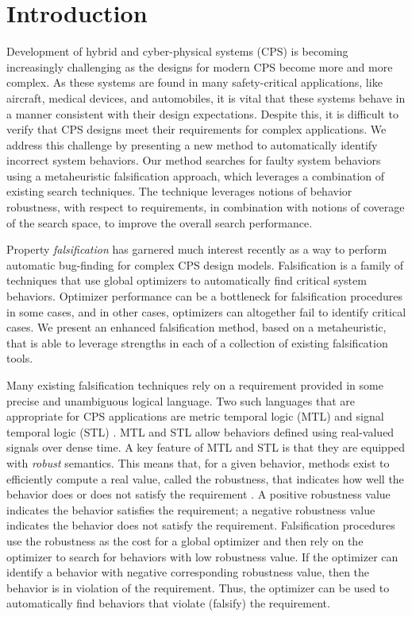 \section{Introduction} \label{sec:introduction}

Development of hybrid and cyber-physical systems (CPS) is becoming increasingly challenging as the designs for modern CPS become more and more complex.
As these systems are found in many safety-critical applications, like aircraft, medical devices, and automobiles, it is vital that these systems behave in a manner consistent with their design expectations. Despite this, it is difficult to verify that CPS designs meet their requirements for complex applications.
We address this challenge by presenting a new method to automatically identify incorrect system behaviors.
Our method searches for faulty system behaviors using a metaheuristic falsification approach, which leverages a combination of existing search techniques.
The technique leverages notions of behavior robustness, with respect to requirements, in combination with notions of coverage of the search space, to improve the overall search performance.

Property \emph{falsification} has garnered much interest recently as a way to perform automatic bug-finding for complex CPS design models.
Falsification is a family of techniques that use global optimizers to automatically find critical system behaviors.
Optimizer performance can be a bottleneck for falsification procedures in some cases, and in other cases, optimizers can altogether fail to identify critical cases.
We present an enhanced falsification method, based on a metaheuristic, that is able to leverage strengths in each of a collection of existing falsification tools. %

Many existing falsification techniques rely on a requirement provided in some precise and unambiguous logical language. Two such languages that are appropriate for CPS applications are metric temporal logic (MTL) and signal temporal logic (STL) \cite{Koymans1990,MalerN04}.
MTL and STL allow behaviors defined using real-valued signals over dense time.
A key feature of MTL and STL is that they are equipped with \emph{robust} semantics. This means that, for a given behavior, methods exist to efficiently compute a real value, called the robustness, that indicates how well the behavior does or does not satisfy the requirement \cite{FainekosP06fates,DonzeM10}. A positive robustness value indicates the behavior satisfies the requirement; a negative robustness value indicates the behavior does not satisfy the requirement. 
Falsification procedures use the robustness as the cost for a global optimizer and then rely on the optimizer to search for behaviors with low robustness value. If the optimizer can identify a behavior with negative corresponding robustness value, then the behavior is in violation of the requirement. Thus, the optimizer can be used to automatically find behaviors that violate (falsify) the requirement.

